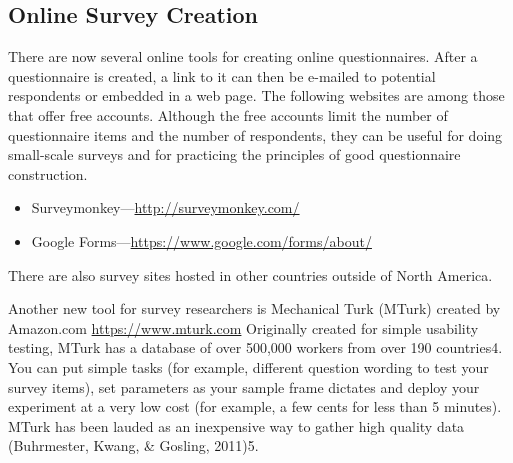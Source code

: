\subsection{Online Survey Creation}

There are now several online tools for creating online questionnaires. After a questionnaire is created, a link to it can then be e-mailed to potential respondents or embedded in a web page. The following websites are among those that offer free accounts. Although the free accounts limit the number of questionnaire items and the number of respondents, they can be useful for doing small-scale surveys and for practicing the principles of good questionnaire construction. 
\begin{itemize}
\item Surveymonkey---\url{http://surveymonkey.com/}
\item Google Forms---\url{https://www.google.com/forms/about/}
\end{itemize}

There are also survey sites hosted in other countries outside of North America.

Another new tool for survey researchers is Mechanical Turk (MTurk) created by Amazon.com
\url{https://www.mturk.com} Originally created for simple usability testing, MTurk has a database of over 500,000 workers from over 190 countries4. You can put simple tasks (for example, different question wording to test your survey items), set parameters as your sample frame dictates and deploy your experiment at a very low cost (for example, a few cents for less than 5 minutes). MTurk has been lauded as an inexpensive way to gather high quality data (Buhrmester, Kwang, \& Gosling, 2011)5.


\subsection{}

